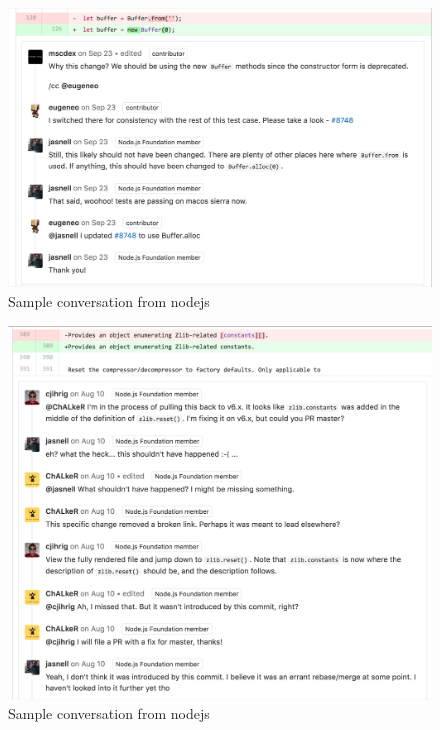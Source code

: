 \documentclass[
]{book}
\begin{document}
\begin{figure}

{\centering \includegraphics[width=1\linewidth]{images/nodejs3} 

}

\caption{Sample conversation from nodejs}\label{fig:nodejs3-fig}
\end{figure}

\begin{figure}

{\centering \includegraphics[width=1\linewidth]{images/nodejs4} 

}

\caption{Sample conversation from nodejs}\label{fig:nodejs4-fig}
\end{figure}
\end{document}
